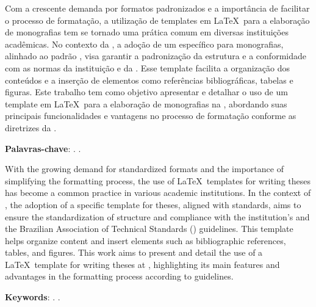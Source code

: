 \setlength{\absparsep}{18pt} %

\begin{resumo}
  Com a crescente demanda por formatos padronizados e a importância de facilitar o processo de formatação, a utilização de templates em \LaTeX\ para a elaboração de monografias tem se tornado uma prática comum em diversas instituições acadêmicas.
  No contexto da \ufma, a adoção de um \template{} específico para monografias, alinhado ao padrão \abnt, visa garantir a padronização da estrutura e a conformidade com as normas da instituição e da \abntfull.
  Esse template facilita a organização dos conteúdos e a inserção de elementos como referências bibliográficas, tabelas e figuras.
  Este trabalho tem como objetivo apresentar e detalhar o uso de um template em \LaTeX\ para a elaboração de monografias na \ufma, abordando suas principais funcionalidades e vantagens no processo de formatação conforme as diretrizes da \abnt.

  \textbf{Palavras-chave}: \abnt. \ufma.
\end{resumo}

\begin{resumo}[Abstract]
  With the growing demand for standardized formats and the importance of simplifying the formatting process, the use of \LaTeX\ templates for writing theses has become a common practice in various academic institutions.
  In the context of \ufma, the adoption of a specific template for theses, aligned with \abnt{} standards, aims to ensure the standardization of structure and compliance with the institution's and the Brazilian Association of Technical Standards (\abnt) guidelines.
  This template helps organize content and insert elements such as bibliographic references, tables, and figures.
  This work aims to present and detail the use of a \LaTeX\ template for writing theses at \ufma, highlighting its main features and advantages in the formatting process according to \abnt{} guidelines.

  \textbf{Keywords}: \abnt. \ufma.
\end{resumo}
